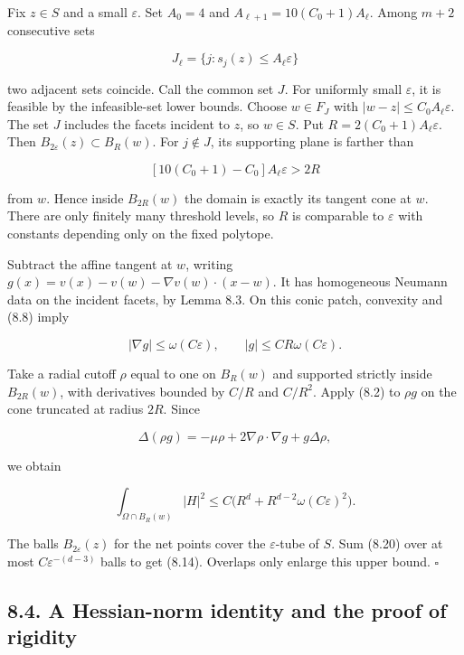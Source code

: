 \documentclass[11pt]{article}
\begin{document}
Fix \(z\in S\) and a small \(\varepsilon\). Set \(A_0=4\) and
\(A_{\ell+1}=10(C_0+1)A_\ell\). Among \(m+2\) consecutive sets

\[
J_\ell=\{j:s_j(z)\le A_\ell\varepsilon\}
\tag{8.16}
\]

two adjacent sets coincide. Call the common set \(J\). For uniformly
small \(\varepsilon\), it is feasible by the infeasible-set lower
bounds. Choose \(w\in F_J\) with \(|w-z|\le C_0A_\ell\varepsilon\). The
set \(J\) includes the facets incident to \(z\), so \(w\in S\). Put
\(R=2(C_0+1)A_\ell\varepsilon\). Then
\(B_{2\varepsilon}(z)\subset B_R(w)\). For \(j\notin J\), its supporting
plane is farther than

\[
[10(C_0+1)-C_0]A_\ell\varepsilon>2R
\tag{8.17}
\]

from \(w\). Hence inside \(B_{2R}(w)\) the domain is exactly its tangent
cone at \(w\). There are only finitely many threshold levels, so \(R\)
is comparable to \(\varepsilon\) with constants depending only on the
fixed polytope.

Subtract the affine tangent at \(w\), writing
\(g(x)=v(x)-v(w)-\nabla v(w)\cdot(x-w)\). It has homogeneous Neumann
data on the incident facets, by Lemma 8.3. On this conic patch,
convexity and (8.8) imply

\[
|\nabla g|\le\omega(C\varepsilon),\qquad
|g|\le CR\omega(C\varepsilon).
\tag{8.18}
\]

Take a radial cutoff \(\rho\) equal to one on \(B_R(w)\) and supported
strictly inside \(B_{2R}(w)\), with derivatives bounded by \(C/R\) and
\(C/R^2\). Apply (8.2) to \(\rho g\) on the cone truncated at radius
\(2R\). Since

\[
\Delta(\rho g)=-\mu\rho+2\nabla\rho\cdot\nabla g+g\Delta\rho,
\tag{8.19}
\]

we obtain

\[
\int_{\Omega\cap B_R(w)}|H|^2
 \le C\bigl(R^d+R^{d-2}\omega(C\varepsilon)^2\bigr).
\tag{8.20}
\]

The balls \(B_{2\varepsilon}(z)\) for the net points cover the
\(\varepsilon\)-tube of \(S\). Sum (8.20) over at most
\(C\varepsilon^{-(d-3)}\) balls to get (8.14). Overlaps only enlarge
this upper bound. \(\square\)

\subsection{8.4. A Hessian-norm identity and the proof of
rigidity}\label{a-hessian-norm-identity-and-the-proof-of-rigidity}
\end{document}
